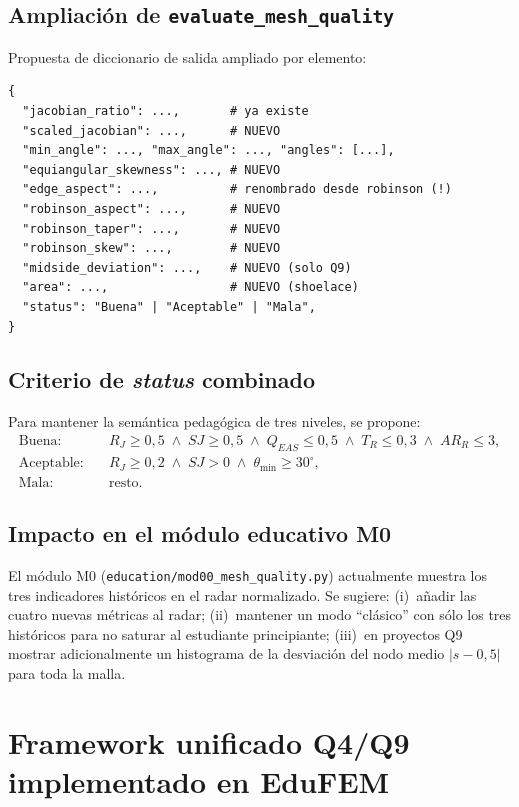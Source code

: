 \documentclass[11pt,a4paper]{article}
\begin{document}
\subsection{Ampliaci\'on de \texttt{evaluate\_mesh\_quality}}
Propuesta de diccionario de salida ampliado por elemento:
\begin{lstlisting}[caption={Campos sugeridos en el resultado de \texttt{evaluate\_mesh\_quality}}]
{
  "jacobian_ratio": ...,       # ya existe
  "scaled_jacobian": ...,      # NUEVO
  "min_angle": ..., "max_angle": ..., "angles": [...],
  "equiangular_skewness": ..., # NUEVO
  "edge_aspect": ...,          # renombrado desde robinson (!)
  "robinson_aspect": ...,      # NUEVO
  "robinson_taper": ...,       # NUEVO
  "robinson_skew": ...,        # NUEVO
  "midside_deviation": ...,    # NUEVO (solo Q9)
  "area": ...,                 # NUEVO (shoelace)
  "status": "Buena" | "Aceptable" | "Mala",
}
\end{lstlisting}

\subsection{Criterio de \emph{status} combinado}
Para mantener la sem\'antica pedag\'ogica de tres niveles, se propone:
\begin{align*}
\text{Buena:}&\quad R_J \ge 0{,}5 \;\wedge\; SJ \ge 0{,}5 \;\wedge\; Q_{EAS} \le 0{,}5 \;\wedge\; T_R \le 0{,}3 \;\wedge\; AR_R \le 3, \\
\text{Aceptable:}&\quad R_J \ge 0{,}2 \;\wedge\; SJ > 0 \;\wedge\; \theta_{\min} \ge 30^\circ, \\
\text{Mala:}&\quad \text{resto.}
\end{align*}

\subsection{Impacto en el m\'odulo educativo M0}
El m\'odulo M0 (\texttt{education/mod00\_mesh\_quality.py}) actualmente muestra los tres indicadores hist\'oricos en el radar normalizado. Se sugiere: (i)~a\~nadir las cuatro nuevas m\'etricas al radar; (ii)~mantener un modo ``cl\'asico'' con s\'olo los tres hist\'oricos para no saturar al estudiante principiante; (iii)~en proyectos Q9 mostrar adicionalmente un histograma de la desviaci\'on del nodo medio $|s-0{,}5|$ para toda la malla.

\section{Framework unificado Q4/Q9 implementado en EduFEM}
\label{sec:unified}
\end{document}

